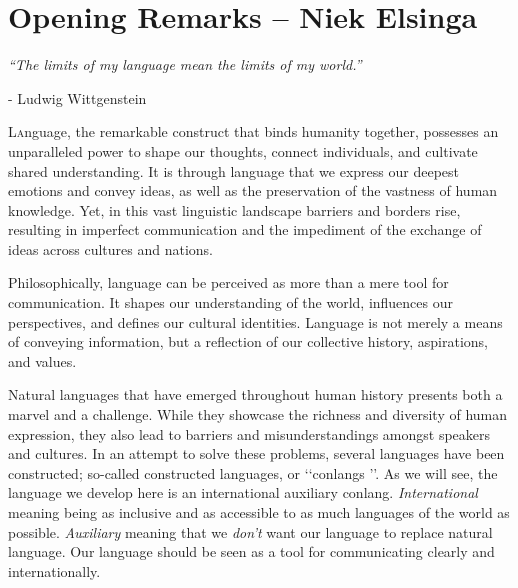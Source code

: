 
\setcounter{subsection}{-1}

\section{Opening Remarks -- {\small Niek Elsinga}}

\textit{“The limits of my language mean the limits of my world.”} 

- Ludwig Wittgenstein 

\vspace{0.7cm}
 

\noindent \lettrine{L}anguage, the remarkable construct that binds humanity together, possesses an unparalleled power to shape our thoughts, connect individuals, and cultivate shared understanding. It is through language that we express our deepest emotions and convey ideas, as well as the preservation of the vastness of human knowledge. Yet, in this vast linguistic landscape barriers and borders rise, resulting in imperfect communication and the impediment of the exchange of ideas across cultures and nations. 

Philosophically, language can be perceived as more than a mere tool for communication. It shapes our understanding of the world, influences our perspectives, and defines our cultural identities. Language is not merely a means of conveying information, but a reflection of our collective history, aspirations, and values. 

Natural languages that have emerged throughout human history presents both a marvel and a challenge. While they showcase the richness and diversity of human expression, they also lead to barriers and misunderstandings amongst speakers and cultures. In an attempt to solve these problems, several languages have been constructed; so-called constructed languages, or \lq\lq conlangs \rq\rq. As we will see, the language we develop here is an international auxiliary conlang. {\it International} meaning being as inclusive and as accessible to as much languages of the world as possible. {\it Auxiliary} meaning that we {\it don't} want our language to replace natural language. Our language should be seen as a tool for communicating clearly and internationally. 



